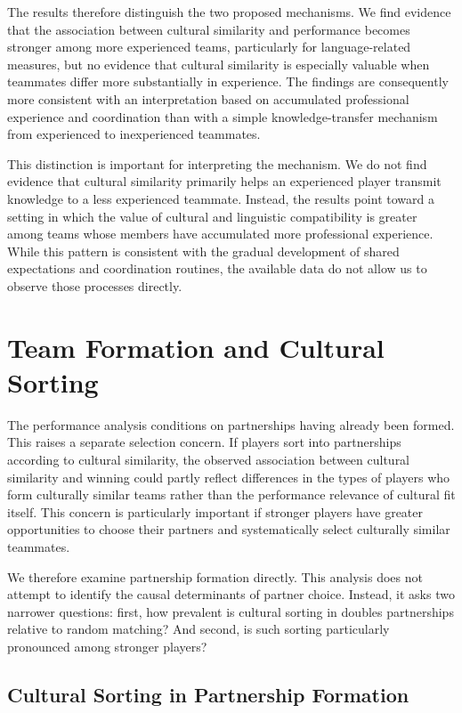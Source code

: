 \documentclass[10pt]{article}
\begin{document}
The results therefore distinguish the two proposed mechanisms. We find evidence that the association between cultural similarity and performance becomes stronger among more experienced teams, particularly for language-related measures, but no evidence that cultural similarity is especially valuable when teammates differ more substantially in experience. The findings are consequently more consistent with an interpretation based on accumulated professional experience and coordination than with a simple knowledge-transfer mechanism from experienced to inexperienced teammates.

This distinction is important for interpreting the mechanism. We do not find evidence that cultural similarity primarily helps an experienced player transmit knowledge to a less experienced teammate. Instead, the results point toward a setting in which the value of cultural and linguistic compatibility is greater among teams whose members have accumulated more professional experience. While this pattern is consistent with the gradual development of shared expectations and coordination routines, the available data do not allow us to observe those processes directly.

 

\section{Team Formation and Cultural Sorting}


The performance analysis conditions on partnerships having already been formed. This raises a separate selection concern. If players sort into partnerships according to cultural similarity, the observed association between cultural similarity and winning could partly reflect differences in the types of players who form culturally similar teams rather than the performance relevance of cultural fit itself. This concern is particularly important if stronger players have greater opportunities to choose their partners and systematically select culturally similar teammates.

We therefore examine partnership formation directly. This analysis does not attempt to identify the causal determinants of partner choice. Instead, it asks two narrower questions: first, how prevalent is cultural sorting in doubles partnerships relative to random matching? And second, is such sorting particularly pronounced among stronger players?

\subsection{Cultural Sorting in Partnership Formation}
\end{document}
